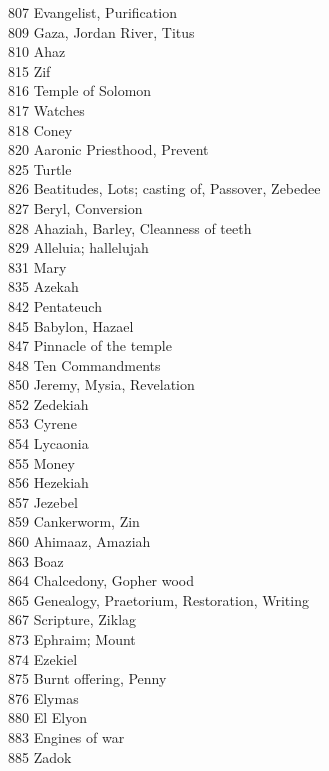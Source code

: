 807 \quad Evangelist, Purification\\
809 \quad Gaza, Jordan River, Titus\\
810 \quad Ahaz\\
815 \quad Zif\\
816 \quad Temple of Solomon\\
817 \quad Watches\\
818 \quad Coney\\
820 \quad Aaronic Priesthood, Prevent\\
825 \quad Turtle\\
826 \quad Beatitudes, Lots; casting of, Passover, Zebedee\\
827 \quad Beryl, Conversion\\
828 \quad Ahaziah, Barley, Cleanness of teeth\\
829 \quad Alleluia; hallelujah\\
831 \quad Mary\\
835 \quad Azekah\\
842 \quad Pentateuch\\
845 \quad Babylon, Hazael\\
847 \quad Pinnacle of the temple\\
848 \quad Ten Commandments\\
850 \quad Jeremy, Mysia, Revelation\\
852 \quad Zedekiah\\
853 \quad Cyrene\\
854 \quad Lycaonia\\
855 \quad Money\\
856 \quad Hezekiah\\
857 \quad Jezebel\\
859 \quad Cankerworm, Zin\\
860 \quad Ahimaaz, Amaziah\\
863 \quad Boaz\\
864 \quad Chalcedony, Gopher wood\\
865 \quad Genealogy, Praetorium, Restoration, Writing\\
867 \quad Scripture, Ziklag\\
873 \quad Ephraim; Mount\\
874 \quad Ezekiel\\
875 \quad Burnt offering, Penny\\
876 \quad Elymas\\
880 \quad El Elyon\\
883 \quad Engines of war\\
885 \quad Zadok\\
